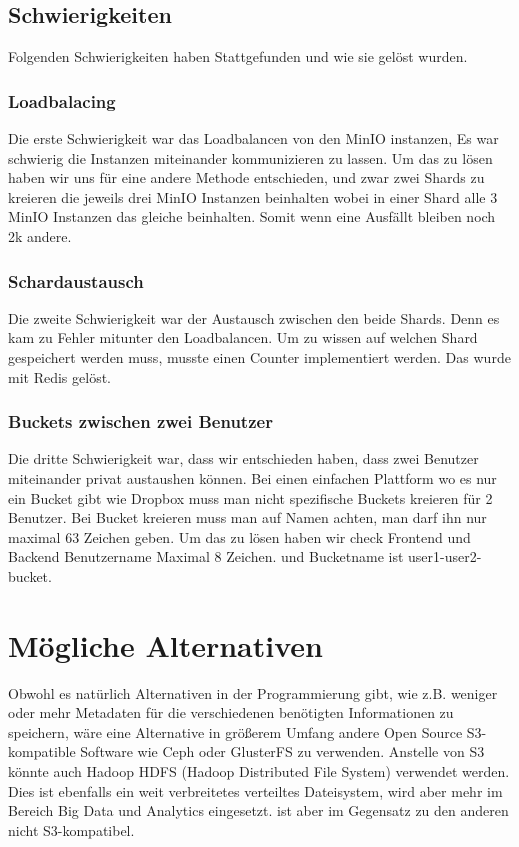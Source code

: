 \documentclass[12pt]{report}
\begin{document}
			\subsection{Schwierigkeiten}
				Folgenden Schwierigkeiten haben Stattgefunden und wie sie gelöst wurden.
				
				\subsubsection{Loadbalacing}
					Die erste Schwierigkeit war das Loadbalancen von den MinIO instanzen, Es war schwierig die Instanzen miteinander kommunizieren zu lassen. Um das zu lösen haben wir uns für eine andere Methode entschieden, und zwar zwei Shards zu kreieren die jeweils drei MinIO Instanzen beinhalten wobei in einer Shard alle 3 MinIO Instanzen das gleiche beinhalten. Somit wenn eine Ausfällt bleiben noch 2k andere.
			
				\subsubsection{Schardaustausch}
					Die zweite Schwierigkeit war der Austausch zwischen den beide Shards. Denn es kam zu Fehler mitunter den Loadbalancen. Um zu wissen auf welchen Shard gespeichert werden muss, musste einen Counter implementiert werden. Das wurde mit Redis gelöst.
				
				\subsubsection{Buckets zwischen zwei Benutzer}
					Die dritte Schwierigkeit war, dass wir entschieden haben, dass zwei Benutzer miteinander privat austaushen können. Bei einen einfachen Plattform wo es nur ein Bucket gibt wie Dropbox muss man nicht spezifische Buckets kreieren für 2 Benutzer. Bei Bucket kreieren muss man auf Namen achten, man darf ihn nur maximal 63 Zeichen geben. Um das zu lösen haben wir check Frontend und Backend Benutzername Maximal 8 Zeichen. und Bucketname ist user1-user2-bucket.
			
	\section{Mögliche Alternativen}
		Obwohl es natürlich Alternativen in der Programmierung gibt, wie z.B. weniger oder mehr Metadaten für die verschiedenen benötigten Informationen zu speichern, wäre eine Alternative in größerem Umfang andere Open Source S3-kompatible Software wie Ceph oder GlusterFS zu verwenden. Anstelle von S3 könnte auch Hadoop HDFS (Hadoop Distributed File System) verwendet werden. Dies ist ebenfalls ein weit verbreitetes verteiltes Dateisystem, wird aber mehr im Bereich Big Data und Analytics eingesetzt. ist aber im Gegensatz zu den anderen nicht S3-kompatibel.
	
\end{document}
